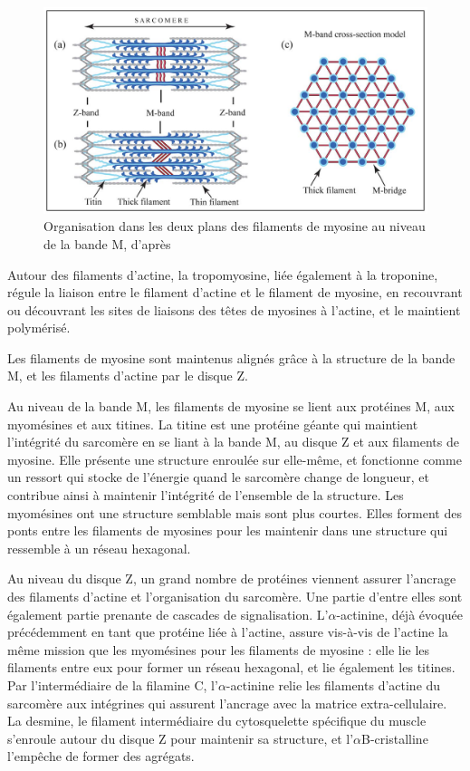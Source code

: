 \documentclass{report}
\begin{document}
\begin{figure}
\includegraphics[scale=0.4]{Figures/Myomesine.png}
\caption{Organisation dans les deux plans des filaments de myosine au niveau de la bande M, d'après \cite{tskhovrebova_making_2012}}
\end{figure}
 
Autour des filaments d'actine, la tropomyosine, liée également à la troponine, régule la liaison entre le filament d'actine et le filament de myosine, en recouvrant ou découvrant les sites de liaisons des têtes de myosines à l'actine, et le maintient polymérisé. 

Les filaments de myosine sont maintenus alignés grâce à la structure de la bande M, et les filaments d'actine par le disque Z. 

Au niveau de la bande M, les filaments de myosine se lient aux protéines M, aux myomésines et aux titines. 
La titine est une protéine géante qui maintient l'intégrité du sarcomère en se liant à la bande M, au disque Z et aux filaments de myosine. Elle présente une structure enroulée sur elle-même, et fonctionne comme un ressort qui stocke de l'énergie quand le sarcomère change de longueur, et contribue ainsi à maintenir l'intégrité de l'ensemble de la structure. 
Les myomésines ont une structure semblable mais sont plus courtes. Elles forment des ponts entre les filaments de myosines pour les maintenir dans une structure qui ressemble à un réseau hexagonal. 

Au niveau du disque Z, un grand nombre de protéines viennent assurer l'ancrage des filaments d'actine et l'organisation du sarcomère. Une partie d'entre elles sont également partie prenante de cascades de signalisation.
L'$\alpha$-actinine, déjà évoquée précédemment en tant que protéine liée à l'actine, assure vis-à-vis de l'actine la même mission que les myomésines pour les filaments de myosine : elle lie les filaments entre eux pour former un réseau hexagonal, et lie également les titines. 
Par l'intermédiaire de la filamine C, l'$\alpha$-actinine relie les filaments d'actine du sarcomère aux intégrines qui assurent l'ancrage avec la matrice extra-cellulaire. 
La desmine, le filament intermédiaire du cytosquelette spécifique du muscle s'enroule autour du disque Z pour maintenir sa structure, et l'$\alpha$B-cristalline l'empêche de former des agrégats. 
\end{document}
